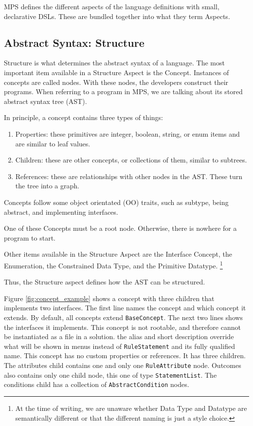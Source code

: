 MPS defines the different aspects of the language definitions with small, declarative DSLs.
These are bundled together into what they term Aspects.

\subsection{Abstract Syntax: Structure}
Structure is what determines the abstract syntax of a language.
The most important item available in a Structure Aspect is the Concept.
Instances of concepts are called nodes.
With these nodes, the developers construct their programs.
When referring to a program in MPS, we are talking about its stored abstract syntax tree (AST).

In principle, a concept contains three types of things:
\begin{enumerate}
    \setlength\itemsep{0em}
    \item Properties: these primitives are integer, boolean, string, or enum items and are similar to leaf values.
    \item Children: these are other concepts, or collections of them, similar to subtrees.
    \item References: these are relationships with other nodes in the AST. These turn the tree into a graph.
\end{enumerate}

Concepts follow some object orientated (OO) traits, such as subtype, being abstract, and implementing interfaces.

One of these Concepts must be a root node. 
Otherwise, there is nowhere for a program to start.

Other items available in the Structure Aspect are the Interface Concept, the Enumeration, the Constrained Data Type, and the Primitive Datatype.
\footnote{At the time of writing, we are unaware whether Data Type and Datatype are semantically different or that the different naming is just a style choice.}

Thus, the Structure aspect defines how the AST can be structured.

Figure \ref{fig:concept_example} shows a concept with three children that implements two interfaces.
The first line names the concept and which concept it extends.
By default, all concepts extend \texttt{BaseConcept}.
The next two lines shows the interfaces it implements.
This concept is not rootable, and therefore cannot be instantiated as a file in a solution.
the alias and short description override what will be shown in menus instead of \texttt{RuleStatement} and its fully qualified name.
This concept has no custom properties or references.
It has three children.
The attributes child contains one and only one \texttt{RuleAttribute} node.
Outcomes also contains only one child node, this one of type \texttt{StatementList}.
The conditions child has a collection of \texttt{AbstractCondition} nodes.

